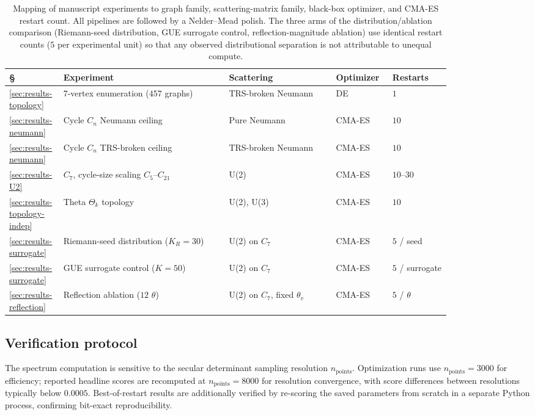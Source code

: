 \documentclass[cntp]{ipart}
\theoremstyle{plain}
\theoremstyle{remark}
\begin{document}
\begin{table}[H]
\centering
\footnotesize
\begin{tabular}{@{}p{0.06\linewidth}p{0.34\linewidth}p{0.22\linewidth}p{0.10\linewidth}p{0.12\linewidth}@{}}
\hline
\S & Experiment & Scattering & Optimizer & Restarts \\
\hline
\ref{sec:results-topology} & $7$-vertex enumeration ($457$ graphs) & TRS-broken Neumann & DE & $1$ \\
\ref{sec:results-neumann} & Cycle $C_n$ Neumann ceiling & Pure Neumann & CMA-ES & $10$ \\
\ref{sec:results-neumann} & Cycle $C_n$ TRS-broken ceiling & TRS-broken Neumann & CMA-ES & $10$ \\
\ref{sec:results-U2} & $C_7$, cycle-size scaling $C_5$--$C_{21}$ & U(2) & CMA-ES & $10$--$30$ \\
\ref{sec:results-topology-indep} & Theta $\Theta_k$ topology & U(2), U(3) & CMA-ES & $10$ \\
\ref{sec:results-surrogate} & Riemann-seed distribution ($K_R=30$) & U(2) on $C_7$ & CMA-ES & $5$ / seed \\
\ref{sec:results-surrogate} & GUE surrogate control ($K=50$) & U(2) on $C_7$ & CMA-ES & $5$ / surrogate \\
\ref{sec:results-reflection} & Reflection ablation ($12$ $\theta$) & U(2) on $C_7$, fixed $\theta_v$ & CMA-ES & $5$ / $\theta$ \\
\hline
\end{tabular}
\caption{Mapping of manuscript experiments to graph family, scattering-matrix family, black-box optimizer, and CMA-ES restart count. All pipelines are followed by a Nelder--Mead polish. The three arms of the distribution/ablation comparison (Riemann-seed distribution, GUE surrogate control, reflection-magnitude ablation) use identical restart counts ($5$ per experimental unit) so that any observed distributional separation is not attributable to unequal compute.}
\label{tab:experiment-map}
\end{table}

\subsection{Verification protocol}
\label{sec:methods-verify}

The spectrum computation is sensitive to the secular determinant sampling resolution $n_{\mathrm{points}}$. Optimization runs use $n_{\mathrm{points}} = 3000$ for efficiency; reported headline scores are recomputed at $n_{\mathrm{points}} = 8000$ for resolution convergence, with score differences between resolutions typically below $0.0005$. Best-of-restart results are additionally verified by re-scoring the saved parameters from scratch in a separate Python process, confirming bit-exact reproducibility.
\end{document}
